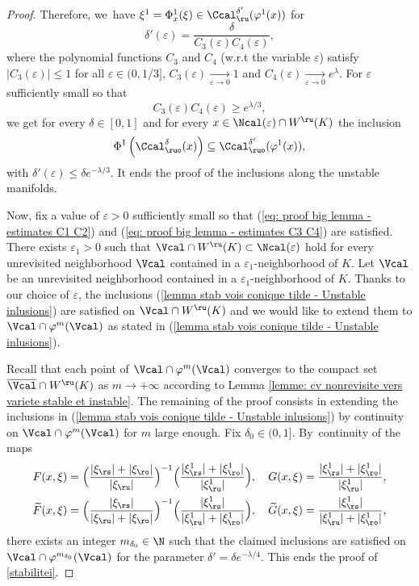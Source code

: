 \begin{proof}
Therefore, we~have $\xi^1 = \Phi_x^1 (\xi) \in \Ccal_\ru^{\delta'}(\varphi^1 (x))$ for
\[
\delta'(\varepsilon) = \frac{\delta }{C_3 (\varepsilon) C_4 (\varepsilon)},
\]
where the polynomial functions $C_3$ and $C_4$ (w.r.t the variable $\varepsilon$) satisfy $|C_3 (\varepsilon)| \leq 1$ for all $\varepsilon\in(0,1/3]$, $ C_3 (\varepsilon) \underset{\varepsilon \to 0}{\to} 1$ and $C_4 (\varepsilon) \underset{\varepsilon \to 0}{\to} e^{\lambda}$. For $\varepsilon$ sufficiently small so that
\begin{equation}\label{eq: proof big lemma - estimates C3 C4}
C_3 (\varepsilon) C_4 (\varepsilon) \geq e^{\lambda/3},
\end{equation}
we get for every $\delta\in[0,1]$ and for every $x \in \Ncal (\varepsilon) \cap W^\ru(K)$ the inclusion
\[
\Phi^{1}\left(\Ccal_{\ruo}^{\delta}(x)\right) \subseteq \Ccal_{\ruo}^{\delta'}(\varphi^{1}(x)),
\]
with $\delta' (\varepsilon) \leq \delta e^{-\lambda/3}$. It ends the proof of the inclusions along the unstable manifolds.

\medskip
Now, fix a value of $\varepsilon > 0$ sufficiently small so that (\ref{eq: proof big lemma - estimates C1 C2}) and (\ref{eq: proof big lemma - estimates C3 C4}) are satisfied. There exists $\varepsilon_1 > 0$ such that $\Vcal \cap W^\ru (K) \subset \Ncal (\varepsilon)$ hold for every unrevisited neighborhood $\Vcal$ contained in a $\varepsilon_1$-neighborhood of $K$. Let $\Vcal$ be an unrevisited neighborhood contained in a $\varepsilon_1$-neighborhood of $K$. Thanks to our choice of $\varepsilon$, the inclusions (\ref{lemma stab vois conique tilde - Unstable inlusions}) are satisfied on $\Vcal \cap W^\ru (K)$ and we would like to extend them to $\Vcal \cap \varphi^m(\Vcal)$ as stated in (\ref{lemma stab vois conique tilde - Unstable inlusions}).

Recall that each point of $\Vcal \cap \varphi^m (\Vcal)$ converges to the compact set $\overline{\Vcal} \cap W^\ru (K)$ as $m \to + \infty$ according to Lemma \ref{lemme: cv nonrevisite vers variete stable et instable}. The remaining of the proof consists in extending the inclusions in (\ref{lemma stab vois conique tilde - Unstable inlusions}) by continuity on $\Vcal \cap \varphi^m (\Vcal)$ for $m$ large enough. Fix $\delta_0\in(0,1]$. By~continuity of the maps
\begin{align*}
F (x,\xi) = \Bigl(\frac{|\xi_\rs| + |\xi_\ro|}{|\xi_\ru|}\Bigr)^{-1} \Bigl(\frac{|\xi_\rs^1| + |\xi_\ro^1|}{|\xi_\ru^1|} \Bigr), \quad G (x,\xi) = \frac{|\xi_\rs^1| + |\xi_\ro^1|}{|\xi_\ru^1|}, \\
\widetilde{F} (x,\xi) = \Bigl(\frac{|\xi_\rs|}{|\xi_\ru| + |\xi_\ro|}\Bigr)^{-1} \Bigl(\frac{|\xi_\rs^1|}{|\xi_\ru^1| + |\xi_\ro^1|} \Bigr), \quad \widetilde{G} (x,\xi) = \frac{|\xi_\rs^1|}{|\xi_\ru^1| + |\xi_\ro^1|},
\end{align*}
there exists an integer $m_{\delta_0} \in \N$ such that the claimed inclusions are satisfied on $\Vcal \cap \varphi^{m_{\delta_0}} (\Vcal)$ for the parameter $\delta' = \delta e^{-\lambda/4}$. This ends the proof of \eqref{stabilitei}.


\end{proof}
